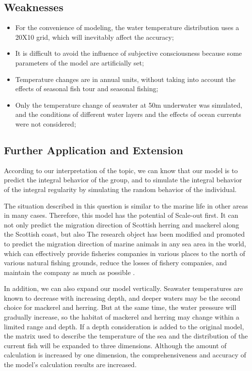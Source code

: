 \documentclass{mcmthesis}
\numberwithin{figure}{section}
\numberwithin{table}{section}
\begin{document}
\subsection{Weaknesses}
\begin{itemize}
  \item For the convenience of modeling, the water temperature distribution uses a 20X10 grid, which will inevitably affect the accuracy;
  \item It is difficult to avoid the influence of subjective consciousness because some parameters of the model are artificially set;
  \item Temperature changes are in annual units, without taking into account the effects of seasonal fish tour and seasonal fishing;
  \item Only the temperature change of seawater at 50m underwater was simulated, and the conditions of different water layers and the effects of ocean currents were not considered;
\end{itemize}

\subsection{Further Application and Extension}
According to our interpretation of the topic, we can know that our model is to predict the integral behavior of the group, and to simulate the integral behavior of the integral regularity by simulating the random behavior of the individual.

The situation described in this question is similar to the marine life in other areas in many cases. Therefore, this model has the potential of Scale-out first. It can not only predict the migration direction of Scottish herring and mackerel along the Scottish coast, but also The research object has been modified and promoted to predict the migration direction of marine animals in any sea area in the world, which can effectively provide fisheries companies in various places to the north of various natural fishing grounds, reduce the losses of fishery companies, and maintain the company as much as possible .

In addition, we can also expand our model vertically. Seawater temperatures are known to decrease with increasing depth, and deeper waters may be the second choice for mackerel and herring. But at the same time, the water pressure will gradually increase, so the habitat of mackerel and herring may change within a limited range and depth. If a depth consideration is added to the original model, the matrix used to describe the temperature of the sea and the distribution of the current fish will be expanded to three dimensions. Although the amount of calculation is increased by one dimension, the comprehensiveness and accuracy of the model's calculation results are increased. 
\newpage
\end{document}
